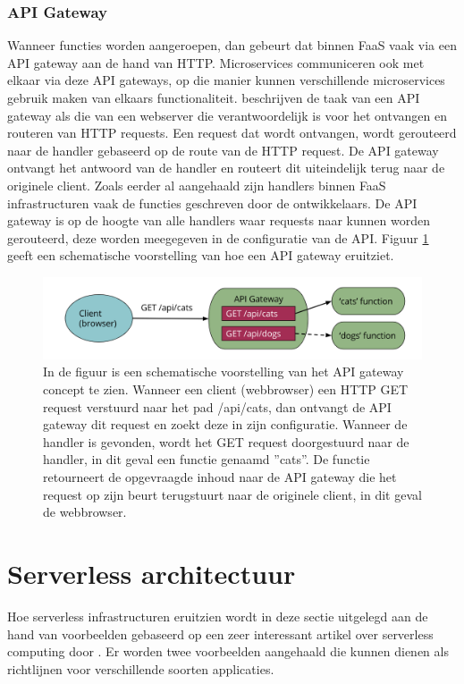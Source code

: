 \subsubsection{API Gateway}
Wanneer functies worden aangeroepen, dan gebeurt dat binnen FaaS vaak via een API gateway aan de hand van HTTP. Microservices communiceren ook met elkaar via deze API gateways, op die manier kunnen verschillende microservices gebruik maken van elkaars functionaliteit.
\textcite{Roberts2017} beschrijven de taak van een API gateway als die van een webserver die verantwoordelijk is voor het ontvangen en routeren van HTTP requests. Een request dat wordt ontvangen, wordt gerouteerd naar de handler gebaseerd op de route van de HTTP request. De API gateway ontvangt het antwoord van de handler en routeert dit uiteindelijk terug naar de originele client. Zoals eerder al aangehaald zijn handlers binnen FaaS infrastructuren vaak de functies geschreven door de ontwikkelaars. De API gateway is op de hoogte van alle handlers waar requests naar kunnen worden gerouteerd, deze worden meegegeven in de configuratie van de API. Figuur \ref{fig:api-gateway} geeft een schematische voorstelling van hoe een API gateway eruitziet.
 
 \begin{figure}
    \includegraphics[width=1\textwidth]{img/api_gateway.png}
    \caption{In de figuur is een schematische voorstelling van het API gateway concept te zien. Wanneer een client (webbrowser) een HTTP GET request verstuurd naar het pad /api/cats, dan ontvangt de API gateway dit request en zoekt deze in zijn configuratie. Wanneer de handler is gevonden, wordt het GET request doorgestuurd naar de handler, in dit geval een functie genaamd ''cats''. De functie retourneert de opgevraagde inhoud naar de API gateway die het request op zijn beurt terugstuurt naar de originele client, in dit geval de webbrowser.\autocite{Roberts2018}} 
    \label{fig:api-gateway}  
\end{figure}

\section{Serverless architectuur}
Hoe serverless infrastructuren eruitzien wordt in deze sectie uitgelegd aan de hand van voorbeelden gebaseerd op een zeer interessant artikel over serverless computing door \textcite{Roberts2018}. Er worden twee voorbeelden aangehaald die kunnen dienen als richtlijnen voor verschillende soorten applicaties.

